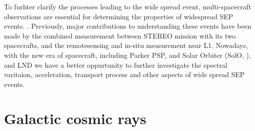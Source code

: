 To furhter clarify the processes leading to the wide spread event, multi-spacecraft observations are essential for determining the properties of widespread SEP events. \citep{Kolhoff2021AA}. Previously, major contributions to understanding these events have been made by the combined measurement between \ac{STEREO} mission with its two spacecrafts, and the remotesensing and in-situ measurement near L1. Nowadays, with the new era of spacecraft, including Parker \ac{PSP},\citet{Fox2016SSRv} and Solar Orbiter (SolO, \citet{Mueller-2020-SolO}), and \ac{LND} \citep{Wimmer2020SSRv} we have a better oppurtunity to further investigate the spectral varitaion, acceleration, transport process and other aspects of wide spread \ac{SEP} events.








\section{Galactic cosmic rays}

